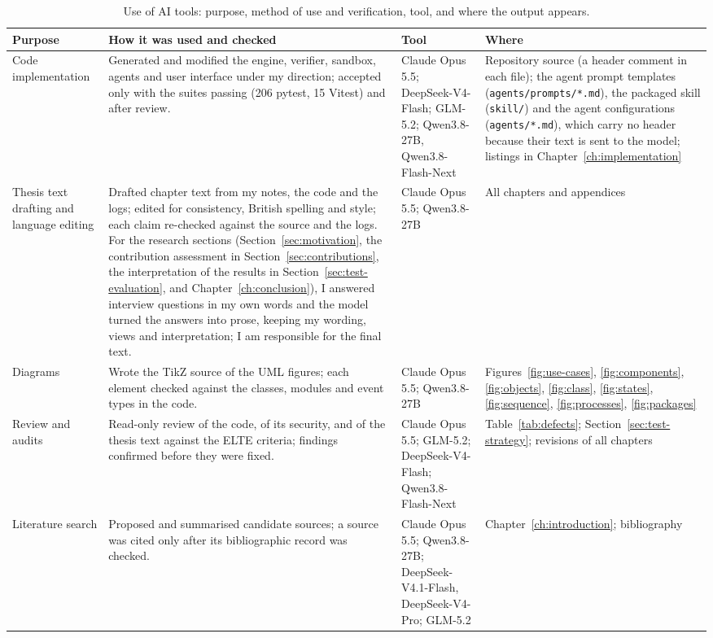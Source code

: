 \begin{table}[H]
\centering
\scriptsize
\setlength{\tabcolsep}{4pt}
\caption{Use of AI tools: purpose, method of use and verification, tool, and
where the output appears.}
\label{tab:ai-use}
\begin{tabular}{@{}p{}p{}p{}p{}@{}}
\toprule
Purpose & How it was used and checked & Tool & Where \\
\midrule
Code implementation & Generated and modified the engine, verifier, sandbox,
agents and user interface under my direction; accepted only with
the suites passing (206 pytest, 15 Vitest) and after review. & Claude Opus
5.5; DeepSeek-V4-Flash; GLM-5.2; Qwen3.8-27B, Qwen3.8-Flash-Next & Repository
source (a header comment in each file); the agent prompt templates
(\texttt{agents/prompts/*.md}), the packaged skill (\texttt{skill/}) and the
agent configurations (\texttt{agents/*.md}), which carry no header because
their text is sent to the model; listings in
Chapter~\ref{ch:implementation} \\
\addlinespace[2pt]
Thesis text drafting and language editing & Drafted chapter text from my
notes, the code and the logs; edited for consistency, British spelling
and style; each claim re-checked against the source and the logs. For the
research sections (Section~\ref{sec:motivation}, the contribution assessment in Section~\ref{sec:contributions}, the
interpretation of the results in Section~\ref{sec:test-evaluation}, and
Chapter~\ref{ch:conclusion}), I answered interview questions in my own
words and the model turned the answers into prose, keeping my wording, views
and interpretation; I am responsible for the final text. & Claude
Opus 5.5; Qwen3.8-27B & All chapters and appendices \\
\addlinespace[2pt]
Diagrams & Wrote the TikZ source of the UML figures; each element checked
against the classes, modules and event types in the code. & Claude Opus
5.5; Qwen3.8-27B &
Figures~\ref{fig:use-cases}, \ref{fig:components}, \ref{fig:objects},
\ref{fig:class}, \ref{fig:states}, \ref{fig:sequence}, \ref{fig:processes},
\ref{fig:packages} \\
\addlinespace[2pt]
Review and audits & Read-only review of the code, of its security, and of the
thesis text against the ELTE criteria; findings confirmed before they were
fixed. & Claude Opus 5.5; GLM-5.2; DeepSeek-V4-Flash;
Qwen3.8-Flash-Next &
Table~\ref{tab:defects}; Section~\ref{sec:test-strategy}; revisions of all chapters \\
\addlinespace[2pt]
Literature search & Proposed and summarised candidate sources; a source was
cited only after its bibliographic record was checked. & Claude Opus 5.5;
Qwen3.8-27B; DeepSeek-V4.1-Flash, DeepSeek-V4-Pro; GLM-5.2 & Chapter~\ref{ch:introduction};
bibliography \\
\bottomrule
\end{tabular}
\end{table}

